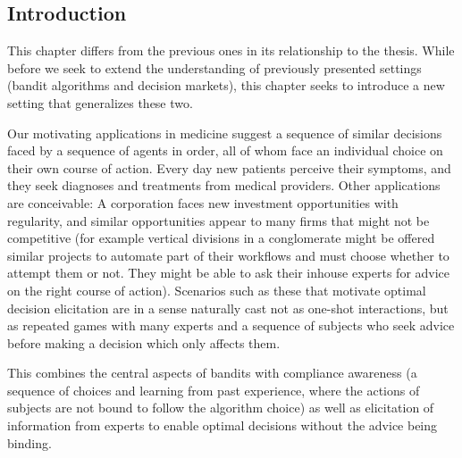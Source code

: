 
\subsection{Introduction}

This chapter differs from the previous ones in its relationship to the thesis. 
While before we seek to extend the understanding of previously presented settings (bandit algorithms and decision markets), this chapter seeks to introduce a new setting that generalizes these two.



Our motivating applications in medicine suggest a sequence of similar decisions faced by a sequence of agents in order, all of whom face an individual choice on their own course of action.
Every day new patients perceive their symptoms, and they seek diagnoses and treatments from medical providers. Other applications are conceivable:
A corporation faces new investment opportunities with regularity, and similar opportunities appear to many firms that might not be competitive (for example vertical divisions in a conglomerate might be offered similar projects to automate part of their workflows and must choose whether to attempt them or not. They might be able to ask their inhouse experts for advice on the right course of action).
Scenarios such as these that motivate optimal decision elicitation are in a sense naturally cast not as one-shot interactions, but as repeated games with many experts and a sequence of subjects who seek advice before making a decision which only affects them.

This combines the central aspects of bandits with compliance awareness (a sequence of choices and learning from past experience, where the actions of subjects are not bound to follow the algorithm choice) as well as elicitation of information from experts to enable optimal decisions without the advice being binding. 




